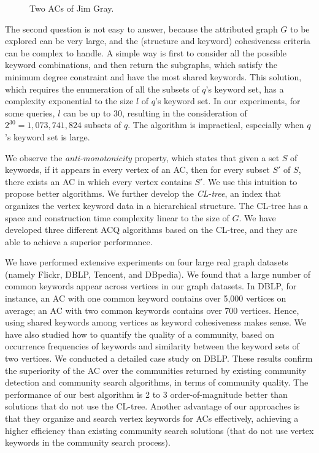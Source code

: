 \begin{figure}[ht]
{{            \label{fig:jim2}
        }
    }
    \caption{Two ACs of Jim Gray.}\label{fig:jim}
\end{figure}

The second question is not easy to answer, because the attributed graph $G$ to be explored can be very large, and the (structure and keyword) cohesiveness criteria can be complex to handle. A simple way is first to consider all the possible keyword combinations, and then return the subgraphs, which satisfy the minimum degree constraint and have the most shared keywords. This solution, which requires the enumeration of all the subsets of $q$'s keyword set, has a complexity exponential to the size $l$ of $q$'s keyword set. In our experiments, for some queries, $l$ can be up to 30, resulting in the consideration of $2^{30}=1,073,741,824$ subsets of $q$. The algorithm is impractical, especially when $q$'s keyword set is large.

We observe the {\it anti-monotonicity} property, which states that given a set $S$ of keywords, if it appears in every vertex of an AC, then for every subset $S'$ of $S$, there exists an AC in which every vertex contains $S'$. We use this intuition to propose better algorithms. We further develop the \emph{CL-tree}, an index that organizes the vertex keyword data in a hierarchical structure. The CL-tree has a space and construction time complexity linear to the size of $G$. We have developed three different ACQ algorithms based on the CL-tree, and they are able to achieve a superior performance.

We have performed extensive experiments on four large real graph datasets (namely Flickr, DBLP, Tencent, and DBpedia).
We found that a large number of common keywords appear across vertices in our graph datasets. In DBLP, for instance, an AC with one common keyword contains over 5,000 vertices on average; an AC with two common keywords contains over 700 vertices. Hence, using shared keywords among vertices as keyword cohesiveness makes sense.
We have also studied how to quantify the quality of a community, based on occurrence frequencies of keywords and similarity between the keyword sets of two vertices. We conducted a detailed case study on DBLP. These results confirm the superiority of the AC over the communities returned by existing community detection and community search algorithms, in terms of community quality. The performance of our best algorithm is 2 to 3 order-of-magnitude better than solutions that do not use the CL-tree. Another advantage of our approaches is that they organize and search vertex keywords for ACs effectively, achieving a higher efficiency than existing community search solutions (that do not use vertex keywords in the community search process).


